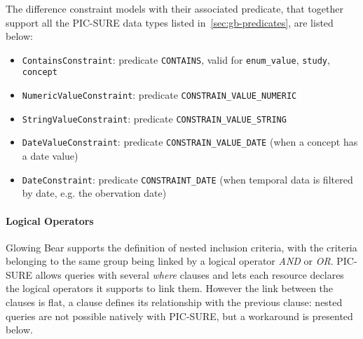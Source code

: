 The difference constraint models with their associated predicate, that together support all the PIC-SURE data types listed in~\ref{sec:gb-predicates}, are listed below:
\begin{itemize}
    \item \verb|ContainsConstraint|: predicate \verb|CONTAINS|, valid for \verb|enum_value|, \verb|study|, \verb|concept| 
    \item \verb|NumericValueConstraint|: predicate \verb|CONSTRAIN_VALUE_NUMERIC|
    \item \verb|StringValueConstraint|: predicate \verb|CONSTRAIN_VALUE_STRING|
    \item \verb|DateValueConstraint|: predicate \verb|CONSTRAIN_VALUE_DATE| (when a concept has a date value)
    \item \verb|DateConstraint|: predicate \verb|CONSTRAINT_DATE| (when temporal data is filtered by date, e.g. the obervation date)
\end{itemize}


\paragraph{Logical Operators}
Glowing Bear supports the definition of nested inclusion criteria, with the criteria belonging to the same group being linked by a logical operator \emph{AND} or \emph{OR}.
PIC-SURE allows queries with several \emph{where} clauses and lets each resource declares the logical operators it supports to link them. 
However the link between the clauses is flat, a clause defines its relationship with the previous clause: nested queries are not possible natively with PIC-SURE, but a workaround is presented below.

